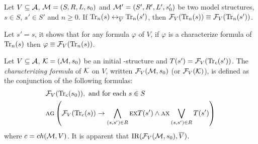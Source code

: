 \documentclass{article}
\begin{document}
\begin{lemma}\label{lem:Vb:TrFormula:Equ}
Let $V\subseteq {\cal A}$, ${\cal M}=(S, R, L, s_0)$ and ${\cal M}'=(S', R', L', s_0')$ be two model structures,
$s\in S$, $s'\in S'$ and $n\ge 0$. If $\textrm{Tr}_n(s) \leftrightarrow_{\overline V} \textrm{Tr}_n(s')$, then ${\cal F}_V(\textrm{Tr}_n(s)) \equiv {\cal F}_V(\textrm{Tr}_n(s'))$.
\end{lemma}
Let $s'=s$, it shows that for any formula $\varphi$ of $V$, if $\varphi$ is a characterize formula of $\textrm{Tr}_n(s)$ then $\varphi \equiv {\cal F}_V(\textrm{Tr}_n(s))$.



Let $V\subseteq\cal A$,
 ${\cal K}=({\cal M},s_0)$ be an initial \MPK-structure and $T(s') = {\cal F}_V(\textrm{Tr}_c(s'))$.
The {\em characterizing formula} of $\cal K$ on $V$, written ${\cal F}_V({\cal M},s_0)$ (or ${\cal F}_V({\cal K})$), is
defined as the conjunction of the following formulas:
\begin{align*}
  &{\cal F}_V(\textrm{Tr}_c(s_0)), \mbox{ and for each } s\in S\\
  & \textsc{a} \textsc{g}\left(
    {\cal F}_V(\textrm{Tr}_c(s)) \rightarrow
    \bigwedge_{(s,s')\in R}
        \textsc{e} \textsc{x} T(s')
        \wedge
        \textsc{a} \textsc{x} \bigvee_{(s,s')\in R}T(s')
    \right)
\end{align*}
where $c=ch({\cal M},V)$. It is apparent that $\textrm{IR}({\cal F}_V({\cal M}, s_0), \overline V)$.
\end{document}
